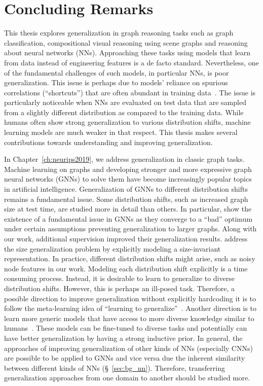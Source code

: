 \chapter{Concluding Remarks}

This thesis explores generalization in graph reasoning tasks such as graph classification, compositional visual reasoning using scene graphs and reasoning about neural networks (NNs).
Approaching these tasks using models that learn from data instead of engineering features is a de facto standard. Nevertheless, one of the fundamental challenges of such models, in particular NNs, is poor generalization. This issue is perhaps due to models' reliance on spurious correlations (``shortcuts'') that are often abundant in training data~\citep{shen2021towards,zhou2021domain,scholkopf2021toward}. The issue is particularly noticeable when NNs are evaluated on test data that are sampled from a slightly different distribution as compared to the training data. 
While humans often show strong generalization to various distribution shifts, machine learning models are much weaker in that respect. 
This thesis makes several contributions towards understanding and improving generalization. 

In Chapter~\ref{ch:neurips2019}, we address generalization in classic graph tasks. Machine learning on graphs and developing stronger and more expressive graph neural networks (GNNs) to solve them have become increasingly popular topics in artificial intelligence.
Generalization of GNNs to different distribution shifts remains a fundamental issue. Some distribution shifts, such as increased graph size at test time, are studied more in detail than others.
In particular, \cite{yehudai2021local} show the existence of a fundamental issue in GNNs as they converge to a ``bad'' optimum under certain assumptions preventing generalization to larger graphs. Along with our work, additional supervision improved their generalization results. \cite{bevilacqua2021size} address the size generalization problem by explicitly modeling a size-invariant representation.
In practice, different distribution shifts might arise, such as noisy node features in our work. Modeling each distribution shift explicitly is a time consuming process. Instead, it is desirable to learn to generalize to diverse distribution shifts. However, this is perhaps an ill-posed task. Therefore, a possible direction to improve generalization without explicitly hardcoding it is to follow the meta-learning idea of ``learning to generalize''~\citep{finn2017model}. Another direction is to learn more generic models that have access to more diverse knowledge similar to humans~\citep{brown2020language,cobbe2021training}. These models can be fine-tuned to diverse tasks and potentially can have better generalization by having a strong inductive prior. In general, the approaches of improving generalization of other kinds of NNs (especially CNNs) are possible to be applied to GNNs and vice versa due the inherent similarity between different kinds of NNs (\S~\ref{sec:bg_nn}). Therefore, transferring generalization approaches from one domain to another should be studied more.


